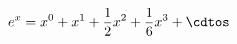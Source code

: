 \documentclass[preview]{standalone}
\begin{document}
\begin{align*}
e^x = x^0 + x^1 + \frac{1}{2} x^2 + \frac{1}{6} x^3 + \cdtos
\end{align*}
\end{document}
